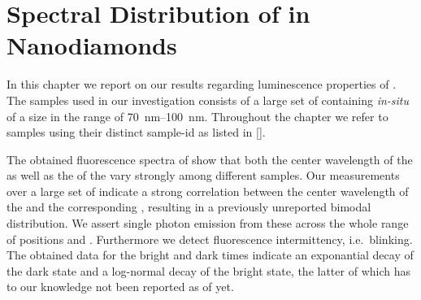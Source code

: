 
\chapter[Spectral Distribution]{Spectral Distribution of \sivs in Nanodiamonds}	\label{ch::distribution}

	In this chapter we report on our results regarding luminescence properties of \sivs. The samples used in our investigation consists of a large set of \CVD \nds containing \textit{in-situ} \sivs of a size in the range of \SIrange{70}{100}{\nm}. Throughout the chapter we refer to samples using their distinct sample-id as listed in \autoref{}.

	The obtained fluorescence spectra of \sivs show that both the center wavelength of the \ZPL as well as the \lw of the \zpl vary strongly among different samples.
	Our measurements over a large set of \sivs indicate a strong correlation between the center wavelength of the \zpl and the corresponding \lws, resulting in a previously unreported bimodal distribution.
	We assert single photon emission from these \sivs across the whole range of \zpl positions and \lws.
	Furthermore we detect fluorescence intermittency, i.e.\ blinking. The obtained data for the bright and dark times indicate
	an exponantial decay of the dark state and a log-normal decay of the bright state, the latter of which has to our knowledge not been reported as of yet.
